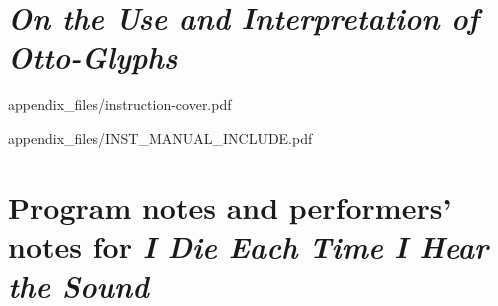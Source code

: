 
\appendix
\chapter{\textit{On the Use and Interpretation of Otto-Glyphs}}


    
    {appendix_files/instruction-cover.pdf}
    
    
    {appendix_files/INST_MANUAL_INCLUDE.pdf}
    

\chapter{Program notes and performers' notes for \textit{I Die Each Time I Hear the Sound}}
    
        

        
            
